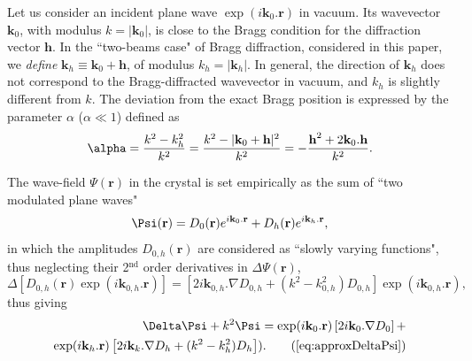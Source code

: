 \documentclass{iucr}
\begin{document}
Let us consider an incident plane wave $\exp(i\textbf{k}_0 . \textbf{r})$ in vacuum. Its wavevector $\textbf{k}_0$, with modulus $k=|\textbf{k}_0|$, is close to the Bragg condition for the diffraction vector $\textbf{h}$.
In the ``two-beams case" of Bragg diffraction, considered in this paper, we \textit{define} $\textbf{k}_h \equiv \textbf{k}_0+\textbf{h}$, of modulus  $k_h=|\textbf{k}_h|$.
In general, the direction of $\textbf{k}_h$ does not correspond to the Bragg-diffracted wavevector in vacuum, and $k_h$ is slightly different from $k$.
The deviation from the exact Bragg position is expressed by the parameter $\alpha$ ($\alpha \ll 1$)
 defined as
\begin{equation}
\label{eq:alpha}
\alpha = \frac{k^2-k_h^2}{k^2} = \frac{k^2-|\textbf k_0 + \textbf h|^2}{k^2} = - \frac{\textbf h^2 + 2 \textbf k_0 . \textbf h}{k^2}.
\end{equation}

The wave-field $\Psi(\textbf{r})$ in the crystal is set empirically as the sum of ``two modulated plane waves"
\begin{equation}
\label{eq:wavefield}
    \Psi(\textbf r) = D_0(\textbf r) e^{i \textbf k_0 . \textbf r} + D_h(\textbf r) e^{i \textbf k_h . \textbf r},
\end{equation}
in which the amplitudes $D_{0,h}(\textbf{r})$ are considered as ``slowly varying functions", thus neglecting their 2$^{\text{nd}}$ order derivatives in $\Delta \Psi(\textbf{r})$,
\begin{equation}
\Delta[D_{0,h}(\textbf{r}) \exp(i\textbf{k}_{0,h} . \textbf{r})] =
 [2 i \textbf{k}_{0,h} . \nabla D_{0,h} + (k^2- k^2_{0,h} ) D_{0,h}] \exp(i\textbf{k}_{0,h} . \textbf{r}), \nonumber
\end{equation}
thus giving
\begin{subequations}\label{eq:approxDeltaPsi}
\begin{align}
    \Delta\Psi + k^2\Psi= 
    \exp(i \textbf{k}_0.\textbf{r})
    \left[ 2 i \textbf{k}_0 . \nabla D_0 \right] + \nonumber \\
    \exp(i \textbf{k}_h.\textbf{r})
    \left[ 2 i \textbf{k}_k . \nabla D_h + (k^2-k_h^2) D_h \right]). \tag{\ref{eq:approxDeltaPsi}}
\end{align}
\end{subequations}
\end{document}
